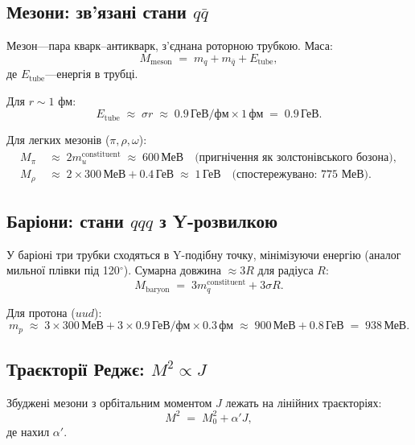 \documentclass[11pt,a4paper]{article}
\theoremstyle{definition}
\theoremstyle{plain}
\theoremstyle{remark}
\begin{document}
\subsection{Мезони: зв’язані стани $q\bar{q}$}

Мезон—пара кварк–антикварк, з’єднана роторною трубкою. Маса:
\begin{equation}
M_{\mathrm{meson}} \;=\; m_q + m_{\bar{q}} + E_{\mathrm{tube}},
\end{equation}
де $E_{\mathrm{tube}}$—енергія в трубці.

Для $r\sim 1$ фм:
\begin{equation}
E_{\mathrm{tube}} \;\approx\; \sigma r \;\approx\; 0{.}9\,\text{ГеВ/фм}\times 1\,\text{фм} \;=\; 0{.}9\,\text{ГеВ}.
\end{equation}

Для легких мезонів ($\pi,\rho,\omega$):
\begin{align}
M_\pi &\;\approx\; 2m_u^{\mathrm{constituent}} \;\approx\; 600\,\text{МеВ} \quad\text{(пригнічення як золстонівського бозона)}, \\
M_\rho &\;\approx\; 2\times 300\,\text{МеВ} + 0{.}4\,\text{ГеВ} \;\approx\; 1\,\text{ГеВ} \quad\text{(спостережувано: 775 МеВ)}.
\end{align}

\subsection{Баріони: стани $qqq$ з Y-розвилкою}

У баріоні три трубки сходяться в Y-подібну точку, мінімізуючи енергію (аналог мильної плівки під 120$^\circ$). Сумарна довжина $\approx 3R$ для радіуса $R$:
\begin{equation}
M_{\mathrm{baryon}} \;=\; 3m_q^{\mathrm{constituent}} + 3\sigma R.
\end{equation}

Для протона ($uud$):
\begin{equation}
m_p \;\approx\; 3\times 300\,\text{МеВ} + 3\times 0{.}9\,\text{ГеВ/фм}\times 0{.}3\,\text{фм} \;\approx\; 900\,\text{МеВ} + 0{.}8\,\text{ГеВ} \;=\; \boxed{938\,\text{МеВ}.}
\end{equation}

\subsection{Траєкторії Реджє: $M^2 \propto J$}

Збуджені мезони з орбітальним моментом $J$ лежать на лінійних траєкторіях:
\begin{equation}
M^2 \;=\; M_0^2 + \alpha' J,
\label{eq:regge-trajectory}
\end{equation}
де нахил $\alpha'$.
\end{document}
